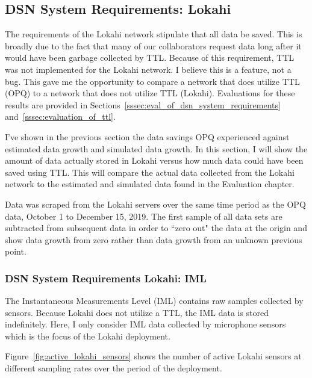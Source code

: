 \subsection{DSN System Requirements: Lokahi}\label{subsec:dsn-system-requirements:-lokahi}

The requirements of the Lokahi network stipulate that all data be saved. This is broadly due to the fact that many of our collaborators request data long after it would have been garbage collected by TTL. Because of this requirement, TTL was not implemented for the Lokahi network. I believe this is a feature, not a bug. This gave me the opportunity to compare a network that does utilize TTL (OPQ) to a network that does not utilize TTL (Lokahi). Evaluations for these results are provided in Sections~\ref{sssec:eval_of_dsn_system_requirements} and~\ref{sssec:evaluation_of_ttl}.

I've shown in the previous section the data savings OPQ experienced against estimated data growth and simulated data growth. In this section, I will show the amount of data actually stored in Lokahi versus how much data could have been saved using TTL. This will compare the actual data collected from the Lokahi network to the estimated and simulated data found in the Evaluation chapter.

Data was scraped from the Lokahi servers over the same time period as the OPQ data, October 1 to December 15, 2019. The first sample of all data sets are subtracted from subsequent data in order to ``zero out" the data at the origin and show data growth from zero rather than data growth from an unknown previous point.

\subsubsection{DSN System Requirements Lokahi: IML}

The Instantaneous Measurements Level (IML) contains raw samples collected by sensors. Because Lokahi does not utilize a TTL, the IML data is stored indefinitely. Here, I only consider IML data collected by microphone sensors which is the focus of the Lokahi deployment.

Figure~\ref{fig:active_lokahi_sensors} shows the number of active Lokahi sensors at different sampling rates over the period of the deployment.

